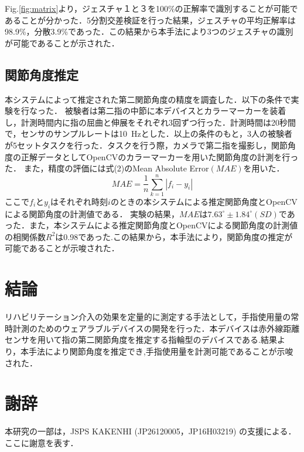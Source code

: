 \documentclass{jarticle}
\begin{document}
Fig.\ref{fig:matrix}より，ジェスチャ１と３を100\%の正解率で識別することが可能であることが分かった．5分割交差検証を行った結果，ジェスチャの平均正解率は98.9\%，分散3.9\%であった．この結果から本手法により3つのジェスチャの識別が可能であることが示された．

\subsection{関節角度推定}
本システムによって推定された第二関節角度の精度を調査した．以下の条件で実験を行なった．
被験者は第二指の中節に本デバイスとカラーマーカーを装着し，計測時間内に指の屈曲と伸展をそれぞれ3回ずつ行った．計測時間は20秒間で，センサのサンプルレートは10\ Hzとした．以上の条件のもと，3人の被験者が5セットタスクを行った．タスクを行う際，カメラで第二指を撮影し，関節角度の正解データとしてOpenCVのカラーマーカーを用いた関節角度の計測を行った．
また，精度の評価には式(2)のMean Absolute Error$(MAE)$を用いた．
\begin{equation}
MAE = \frac{1}{n} \sum^n_{k=1} |f_i-y_i|
\end{equation}
ここで$f_i$と$y_i$はそれぞれ時刻$i$のときの本システムによる推定関節角度とOpenCVによる関節角度の計測値である．
実験の結果，$MAE$は$7.63^\circ \pm1.84^\circ(SD)$であった．また，本システムによる推定関節角度とOpenCVによる関節角度の計測値の相関係数$R^2$は0.98であった.この結果から，本手法により，関節角度の推定が可能であることが示唆された．

\section{結論}
リハビリテーション介入の効果を定量的に測定する手法として，手指使用量の常時計測のためのウェアラブルデバイスの開発を行った．本デバイスは赤外線距離センサを用いて指の第二関節角度を推定する指輪型のデバイスである.結果より，本手法により関節角度を推定でき,手指使用量を計測可能であることが示唆された．

\section{謝辞}
本研究の一部は，JSPS KAKENHI (JP26120005，JP16H03219) の支援による．ここに謝意を表す．

\small


\end{document}
